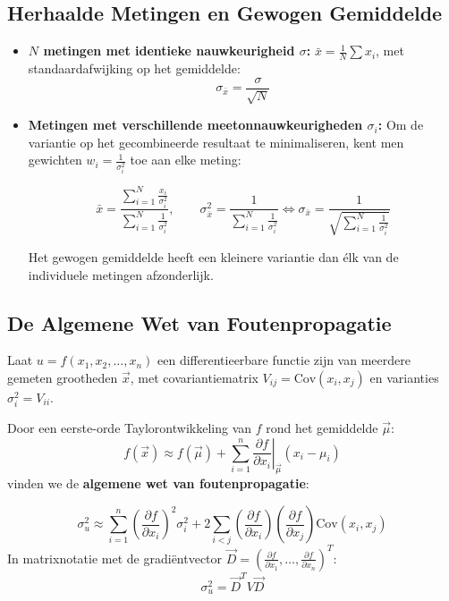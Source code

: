 \documentclass[11pt,a4paper]{article}
\newcommand{\Cov}{\text{Cov}}
\begin{document}
\subsection{Herhaalde Metingen en Gewogen Gemiddelde}
\begin{itemize}[leftmargin=1.5em]
    \item \textbf{$N$ metingen met identieke nauwkeurigheid $\sigma$:}
    $\bar{x} = \frac{1}{N}\sum x_i$, met standaardafwijking op het gemiddelde:
    \begin{equation}
        \sigma_{\bar{x}} = \frac{\sigma}{\sqrt{N}}
    \end{equation}
    \item \textbf{Metingen met verschillende meetonnauwkeurigheden $\sigma_i$:}
    Om de variantie op het gecombineerde resultaat te minimaliseren, kent men gewichten $w_i = \frac{1}{\sigma_i^2}$ toe aan elke meting:
    \begin{formulabox}
    \begin{equation}
        \bar{x} = \frac{\sum_{i=1}^N \frac{x_i}{\sigma_i^2}}{\sum_{i=1}^N \frac{1}{\sigma_i^2}}, \qquad
        \sigma_{\bar{x}}^2 = \frac{1}{\sum_{i=1}^N \frac{1}{\sigma_i^2}} \iff \sigma_{\bar{x}} = \frac{1}{\sqrt{\sum_{i=1}^N \frac{1}{\sigma_i^2}}}
    \end{equation}
    \end{formulabox}
    Het gewogen gemiddelde heeft een kleinere variantie dan élk van de individuele metingen afzonderlijk.
\end{itemize}

\subsection{De Algemene Wet van Foutenpropagatie}
Laat $u = f(x_1, x_2, \ldots, x_n)$ een differentieerbare functie zijn van meerdere gemeten grootheden $\vec{x}$, met covariantiematrix $V_{ij} = \Cov(x_i, x_j)$ en varianties $\sigma_i^2 = V_{ii}$.

Door een eerste-orde Taylorontwikkeling van $f$ rond het gemiddelde $\vec{\mu}$:
\begin{equation}
    f(\vec{x}) \approx f(\vec{\mu}) + \sum_{i=1}^n \left. \frac{\partial f}{\partial x_i} \right|_{\vec{\mu}} (x_i - \mu_i)
\end{equation}
vinden we de \textbf{algemene wet van foutenpropagatie}:

\begin{formulabox}
\begin{equation}
    \sigma_u^2 \approx \sum_{i=1}^n \left( \frac{\partial f}{\partial x_i} \right)^2 \sigma_i^2 + 2 \sum_{i < j} \left( \frac{\partial f}{\partial x_i} \right) \left( \frac{\partial f}{\partial x_j} \right) \Cov(x_i, x_j)
\end{equation}
In matrixnotatie met de gradiëntvector $\vec{D} = \left( \frac{\partial f}{\partial x_1}, \ldots, \frac{\partial f}{\partial x_n} \right)^T$:
\begin{equation}
    \sigma_u^2 = \vec{D}^T V \vec{D}
\end{equation}
\end{formulabox}
\end{document}
